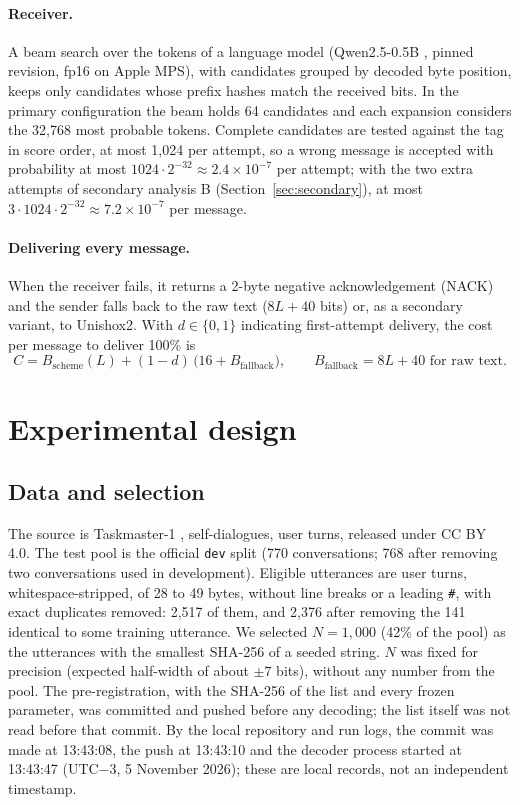 \documentclass[11pt]{article}
\begin{document}
\paragraph{Receiver.} A beam search over the tokens of a language model (Qwen2.5-0.5B
\cite{qwen2024}, pinned revision, fp16 on Apple MPS), with candidates grouped by decoded byte position,
keeps only candidates whose prefix hashes match the received bits. In the primary configuration the
beam holds 64 candidates and each expansion considers the 32,768 most probable tokens. Complete
candidates are tested against the tag in score order, at most 1,024 per attempt, so a wrong message
is accepted with probability at most $1024 \cdot 2^{-32} \approx 2.4 \times 10^{-7}$ per attempt;
with the two extra attempts of secondary analysis B (Section~\ref{sec:secondary}), at most
$3 \cdot 1024 \cdot 2^{-32} \approx 7.2 \times 10^{-7}$ per message.

\paragraph{Delivering every message.} When the receiver fails, it returns a 2-byte negative
acknowledgement (NACK) and the sender falls back to the raw text ($8L + 40$ bits) or, as a secondary
variant, to Unishox2. With $d \in \{0,1\}$ indicating first-attempt delivery, the cost per message to
deliver 100\% is
\begin{equation}
C = B_{\mathrm{scheme}}(L) + (1-d)\,\bigl(16 + B_{\mathrm{fallback}}\bigr),
\qquad B_{\mathrm{fallback}} = 8L + 40 \text{ for raw text.}
\end{equation}

\section{Experimental design}\label{sec:design}

\subsection{Data and selection}

The source is Taskmaster-1 \cite{byrne2019taskmaster}, self-dialogues, user turns, released under
CC BY 4.0. The test pool is the official \texttt{dev} split (770 conversations; 768 after removing two
conversations used in development). Eligible utterances are user turns, whitespace-stripped, of 28 to
49 bytes, without line breaks or a leading \texttt{\#}, with exact duplicates removed: 2,517 of them,
and 2,376 after removing the 141 identical to some training utterance. We selected $N = 1{,}000$
(42\% of the pool) as the utterances with the smallest SHA-256 of a seeded string. $N$ was fixed for
precision (expected half-width of about $\pm 7$ bits), without any number from the pool. The
pre-registration, with the SHA-256 of the list and every frozen parameter, was committed and pushed
before any decoding; the list itself was not read before that commit. By the local repository and
run logs, the commit was made at 13:43:08, the push at 13:43:10 and the decoder process started at
13:43:47 (UTC$-3$, 5 November 2026); these are local records, not an independent timestamp.
\end{document}
